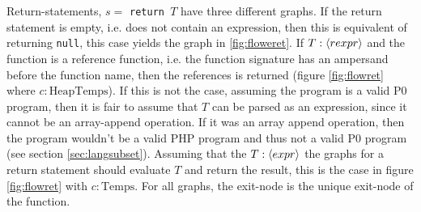 \begin{figure}
{\begin{adjustbox}{max size={.25\textwidth}{.25\textheight}}
\end{adjustbox}}\hfill%
\hspace*{\fill}
\end{figure}

Return-statements, $s =$ \texttt{return $T$} have three different graphs. If the return statement is empty, i.e. does not contain an expression, then this is equivalent of returning \texttt{null}, this case yields the graph in \ref{fig:floweret}. If $T : \langle rexpr\rangle$ and the function is a reference function, i.e. the function signature has an ampersand before the function name, then the references is returned (figure \ref{fig:flowret} where $c : \text{HeapTemps}$). If this is not the case, assuming the program is a valid P0 program, then it is fair to assume that $T$ can be parsed as an expression, since it cannot be an array-append operation. If it was an array append operation, then the program wouldn't be a valid PHP program and thus not a valid P0 program (see section \ref{sec:langsubset}). Assuming that the $T : \langle expr\rangle$ the graphs for a return statement should evaluate $T$ and return the result, this is the case in figure \ref{fig:flowret} with $c : \text{Temps}$.  For all graphs, the exit-node is the unique exit-node of the function.


